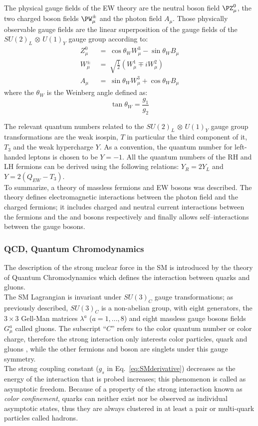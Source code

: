 The physical gauge fields of the EW  theory are the neutral \PZ boson field $\PZ^0_{\mu}$, the two charged \PW boson fields $\PW^{\pm}_{\mu}$ and the photon field $A_{\mu}$. Those physically observable gauge fields are the linear superposition of the gauge fields of the $SU(2)_{L}$ $\otimes$ $U(1)_{Y}$ gauge group according to:
\begin{align}
Z^0_{\mu} \; &= \; \cos\theta_{W} W^3_{\mu} - \sin\theta_{W} B_{\mu} \label{eq:z}\\
W^{\pm}_{\mu} \; &= \; \sqrt{\frac{1}{2}}(W^1_{\mu} \mp iW^2_{\mu}) \label{eq:w}\\
A_{\mu} \; &= \; \sin\theta_{W} W^3_{\mu} + \cos\theta_{W} B_{\mu} \label{eq:photon}
\end{align}
where the $\theta_W$ is the Weinberg angle defined as:
\begin{equation}
\label{eq:weinberg}
\tan \theta_W = \frac{g_1}{g_2}
\end{equation}

The relevant quantum numbers related to the $SU(2)_{L}$ $\otimes$ $U(1)_{Y}$ gauge group transformations are the weak isospin, $T$ in particular the third component of it, $T_3$ and the weak hypercharge $Y$. As a convention, the quantum number for left-handed leptons is chosen to be $Y = -1$. All the quantum numbers of the RH and LH fermions can be derived using the following relations: $Y_R = 2Y_L$ and $Y = 2(Q_{EW}-T_3)$.\\

To summarize, a theory of massless fermions and EW bosons was described. The theory defines electromagnetic interactions between the photon field and the charged fermions; it includes charged and neutral current interactions between the fermions and the \PW and \PZ bosons respectively and finally allows self–interactions between the gauge bosons. 

\subsubsection{QCD, Quantum Chromodynamics}\label{sec:qcd}
The description of the strong nuclear force in the SM is introduced by the theory of Quantum Chromodynamics which defines the interaction between quarks and gluons.\\
The SM Lagrangian is invariant under $SU(3)_C$ gauge transformations; as previously described, $SU(3)_C$ is a non-abelian group, with eight generators, the $3\times3$ Gell-Man matrices $\lambda^a$ ($a = 1,...,8$) and eight massless gauge bosons fields $G^a_{\mu}$ called gluons. The subscript ``$C$'' refers to the color quantum number or color charge, therefore the strong interaction only interests color particles, quark and gluons , while the other fermions and boson are singlets under this gauge symmetry. \\ 
The strong coupling constant ($g_s$ in Eq.~\ref{eq:SMderivative}) decreases as the energy of the interaction that is probed increases; this phenomenon is called as asymptotic freedom.
Because of a property of the strong interaction known as \emph{color confinement}, quarks can neither exist nor be observed as individual asymptotic states, thus they are always clustered in at least a pair or multi-quark particles called hadrons.


